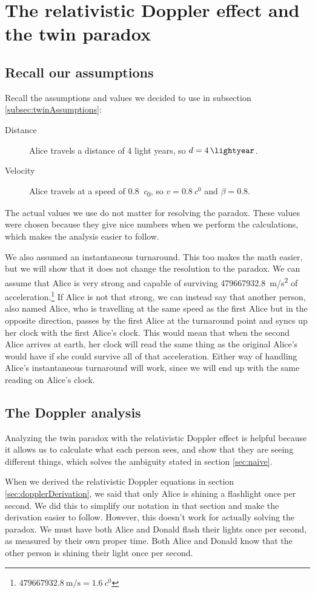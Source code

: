 \section{The relativistic Doppler effect and the twin paradox}\label{sec:dopplerAnalysis}
	\subsection{Recall our assumptions}
		Recall the assumptions and values we decided to use in subsection \ref{subsec:twinAssumptions}:
		\begin{description}
			\item[Distance] Alice travels a distance of 4 light years, so $d = \SI{4}{\lightyear}$.
			\item[Velocity] Alice travels at a speed of \SI{0.8}{\clight}, so $v = \SI{0.8}{\clight}$ and $\beta = 0.8$.
		\end{description}
		The actual values we use do not matter for resolving the paradox.
		These values were chosen because they give nice numbers when we perform the calculations, which makes the analysis easier to follow.

		We also assumed an instantaneous turnaround.
		This too makes the math easier, but we will show that it does not change the resolution to the paradox.
		We can assume that Alice is very strong and capable of surviving \SI{479667932.8}{\metre/\second^2} of acceleration.\footnote{$\SI{479667932.8}{\metre/\second} = \SI{1.6}{\clight}$}
		If Alice is not that strong, we can instead say that another person, also named Alice, who is travelling at the same speed as the first Alice but in the opposite direction, passes by the first Alice at the turnaround point and syncs up her clock with the first Alice's clock.
		This would mean that when the second Alice arrives at earth, her clock will read the same thing as the original Alice's would have if she could survive all of that acceleration.
		Either way of handling Alice's instantaneous turnaround will work, since we will end up with the same reading on Alice's clock.
	\subsection{The Doppler analysis}
		Analyzing the twin paradox with the relativistic Doppler effect is helpful because it allows us to calculate what each person sees, and show that they are seeing different things, which solves the ambiguity stated in section \ref{sec:naive}.

		When we derived the relativistic Doppler equations in section \ref{sec:dopplerDerivation}, we said that only Alice is shining a flashlight once per second.
		We did this to simplify our notation in that section and make the derivation easier to follow.
		However, this doesn't work for actually solving the paradox.
		We must have both Alice and Donald flash their lights once per second, as measured by their own proper time.
		Both Alice and Donald know that the other person is shining their light once per second.

